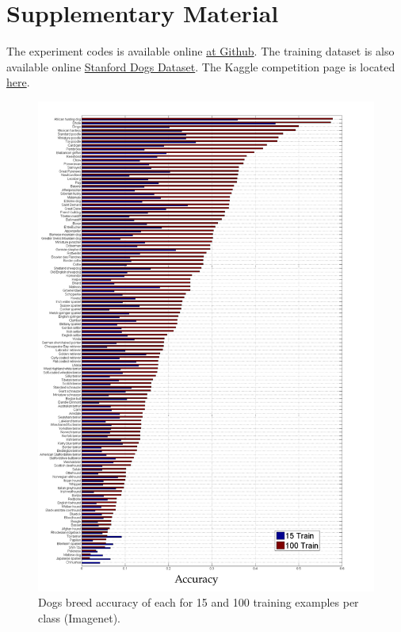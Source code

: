\documentclass[10pt,twocolumn,letterpaper]{article}
\begin{document}
\section{Supplementary Material}

The experiment codes is available online
\href{https://github.com/FrankDidier/SAGAN-generation-of-pictures-of-dogs}{at Github}.
The training dataset is also available online
\href{http://vision.stanford.edu/aditya86/ImageNetDogs/}{Stanford Dogs Dataset}.
The Kaggle competition page is located
\href{https://www.kaggle.com/c/generative-dog-images/overview}{here}.

\begin{figure}
  \includegraphics[width=1.0\linewidth]{images/imagenet_acc.png}
  \caption{Dogs breed accuracy of each for 15 and 100 training examples per class (Imagenet).}
  \label{fig:imagenet_acc}
\end{figure}


\nocite{*}

{\small


}

\end{document}
